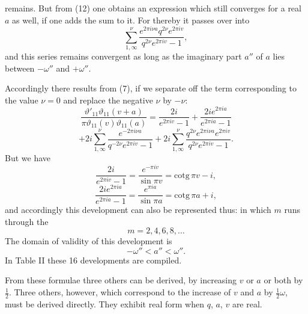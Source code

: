 remains. But from (12) one obtains an expression which still converges
for a real $a$ as well, if one adds the sum
to it. For thereby it passes over into
\[
\sum_{1,\infty}^{\nu} \frac{e^{2\pi i\nu a}q^{2\nu}e^{2\pi iv}}{q^{2\nu}e^{2\pi iv} - 1},
\]
and this series remains convergent as long as the imaginary part $a''$
of $a$ lies between $-\omega''$ and $+\omega''$.

Accordingly there results from (7), if we separate off the term
corresponding to the value $\nu = 0$ and replace the negative $\nu$ by
$-\nu$:
\[
\frac{\vartheta'_{11}\vartheta_{11}(v+a)}{\pi\vartheta_{11}(v)\vartheta_{11}(a)} = \frac{2i}{e^{2\pi iv} - 1} + \frac{2ie^{2\pi ia}}{e^{2\pi ia} - 1}
\]
\[
+ 2i\sum_{1,\infty}^{\nu} \frac{e^{-2\pi i\nu a}}{q^{-2\nu}e^{2\pi iv} - 1} + 2i\sum_{1,\infty}^{\nu} \frac{q^{2\nu}e^{2\pi i\nu a}e^{2\pi iv}}{q^{2\nu}e^{2\pi iv} - 1}.
\]
But we have
\[
\frac{2i}{e^{2\pi iv} - 1} = \frac{e^{-\pi iv}}{\sin\pi v} = \mathrm{cotg}\,\pi v - i,
\]
\[
\frac{2ie^{2\pi ia}}{e^{2\pi ia} - 1} = \frac{e^{\pi ia}}{\sin\pi a} = \mathrm{cotg}\,\pi a + i,
\]
and accordingly this development can also be represented thus:
in which $m$ runs through the 
\[
m = 2, 4, 6, 8, \dots
\]
The domain of validity of this development is
\[
-\omega'' < a'' < \omega''.
\]
In Table II these 16 developments are compiled.

From these formulae three others can be derived, by increasing
$v$ or $a$ or both by $\frac{1}{2}$. Three others, however, which correspond to the
increase of $v$ and $a$ by $\frac{1}{2}\omega$, must be derived directly.
They exhibit real form when $q$, $a$, $v$ are real.
